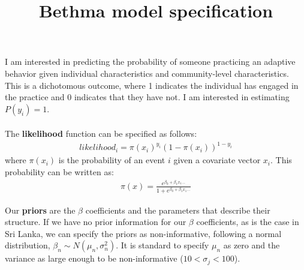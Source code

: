 \documentclass{article}
\begin{document}
\title{Bethma model specification}

I am interested in predicting the probability of someone practicing an adaptive behavior given individual characteristics and community-level characteristics.  This is a dichotomous outcome, where 1 indicates the individual has engaged in the practice and 0 indicates that they have not.  I am interested in estimating $P(y_i) = 1$.  \\
\\
The \textbf{likelihood} function can be specified as follows:
\begin{align}
likelihood_i = \pi(x_i)^{y_i}(1-\pi(x_i))^{1-y_i}
\end{align}
where $\pi(x_i)$ is the probability of an event $i$ given a covariate vector $x_i$.  This probability can be written as:
\begin{align}
\pi(x) = \frac{e^{\beta_0 + \beta_1x_1 ...}}{1 + e^{\beta_0 + \beta_1x_1...}}
\end{align}

Our \textbf{priors} are the $\beta$ coefficients and the parameters that describe their structure.  If we have no prior information for our $\beta$ coefficients, as is the case in Sri Lanka, we can specify the priors as non-informative, following a normal distribution, $\beta_n \sim N(\mu_n, \sigma_n^2)$.  It is standard to specify $\mu_n$ as zero and the variance as large enough to be non-informative ($10 < \sigma_j < 100$).
\end{document}
